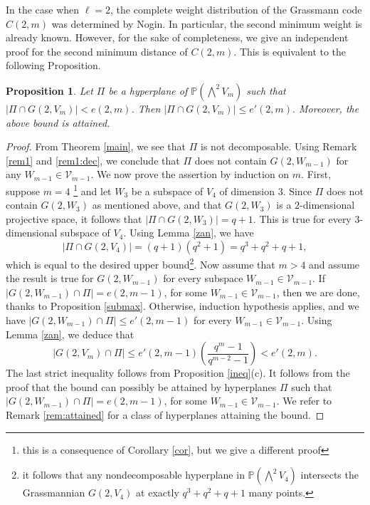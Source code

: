 \documentclass[10pt,a4paper,oneside]{amsproc}
\newtheorem{proposition}[theorem]{Proposition}
\def\PP{{\mathbb P}}
\newcommand{\V}{{\mathcal{V}}}
\begin{document}
In the case when $\ell = 2$, the complete weight distribution of the Grassmann code $C(2, m)$ was determined by Nogin. In particular, the second minimum weight is already known. However, for the sake of completeness, we give an independent proof for the second minimum distance of $C(2, m)$. This is equivalent to the following Proposition. 

\begin{proposition}\label{l2}
    Let $\Pi$ be a hyperplane of $\PP\left(\bigwedge^2 V_m\right)$ such that $|\Pi \cap G(2, V_m)| < e (2, m)$. Then
    $|\Pi \cap G(2, V_m)| \le e' (2, m).$
    Moreover, the above bound is attained.
\end{proposition}

\begin{proof}
    From Theorem \ref{main}, we see that $\Pi$ is not decomposable. Using Remark \ref{rem1} and \ref{rem1:dec}, we conclude that $\Pi$ does not contain $G(2, W_{m-1})$ for any $W_{m-1} \in \V_{m-1}$. We now prove the assertion by induction on $m$. First, suppose $m = 4$ \footnote{this is a consequence of Corollary \ref{cor}, but we give a different proof} and let $W_3$ be a subspace of $V_4$ of dimension $3$. Since $\Pi$ does not contain $G(2, W_3)$ as mentioned above, and that $G(2, W_3)$ is a $2$-dimensional projective space, it follows that $|\Pi \cap G(2, W_3)| = q+1$. This is true for every $3$-dimensional subspace of $V_4$. Using Lemma \ref{zan}, we have
   $$|\Pi \cap G(2, V_4)| = (q+1) (q^2 + 1) = q^3 + q^2 + q + 1,$$
   which is equal to the desired upper bound\footnote{it follows that any nondecomposable hyperplane in $\PP\left( \bigwedge^2 V_4 \right)$ intersects the Grassmannian $G(2, V_4)$ at exactly $q^3 + q^2 + q + 1$ many points.}. Now assume that $m > 4$ and assume the result is true for $G(2, W_{m-1})$ for every subspace $W_{m-1} \in \V_{m-1}$.
   If $|G(2, W_{m-1}) \cap \Pi| = e(2, m-1)$, for some $W_{m-1} \in \V_{m-1}$, then we are done, thanks to Proposition \ref{submax}. Otherwise, induction hypothesis applies, and we have 
   $\displaystyle{|G(2, W_{m-1}) \cap \Pi| \le e' (2, m-1)}$ for every $W_{m-1} \in \V_{m-1}$.
   Using Lemma \ref{zan}, we deduce that
   $$|G(2, V_m) \cap \Pi| \le e' (2, m-1)\left(\frac{q^m - 1}{q^{m-2} - 1}\right) < e'(2, m).$$
   The last strict inequality follows from Proposition \ref{ineq}(c). It follows from the proof that the bound can possibly be attained by hyperplanes $\Pi$ such that $|G(2, W_{m-1}) \cap \Pi| = e(2, m-1)$, for some $W_{m-1}\in \V_{m-1}$. We refer to Remark \ref{rem:attained} for a class of hyperplanes attaining the bound. 
\end{proof}
\end{document}
